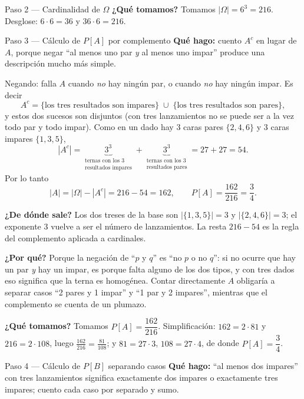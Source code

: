 \documentclass[11pt]{article}
\begin{document}
\begin{sol}
\begin{paso}{Paso 2 --- Cardinalidad de $\Omega$}
\textbf{¿Qu\'e tomamos?} Tomamos $|\Omega|=6^{3}=216$. Desglose: $6\cdot 6=36$ y $36\cdot 6=216$.
\end{paso}

\begin{paso}{Paso 3 --- C\'alculo de $P[A]$ por complemento}
\textbf{Qu\'e hago:} cuento $A^{c}$ en lugar de $A$, porque negar ``al menos uno par \emph{y} al menos uno impar'' produce una descripci\'on mucho m\'as simple.

Negando: falla $A$ cuando \emph{no} hay ning\'un par, o cuando \emph{no} hay ning\'un impar. Es decir
\[
A^{c}=\{\text{los tres resultados son impares}\}\;\cup\;\{\text{los tres resultados son pares}\},
\]
y estos dos sucesos son disjuntos (con tres lanzamientos no se puede ser a la vez todo par y todo impar). Como en un dado hay $3$ caras pares $\{2,4,6\}$ y $3$ caras impares $\{1,3,5\}$,
\[
|A^{c}|
=\underbrace{3^{3}}_{\substack{\text{ternas con los 3}\\ \text{resultados impares}}}
+\underbrace{3^{3}}_{\substack{\text{ternas con los 3}\\ \text{resultados pares}}}
=27+27=54 .
\]
Por lo tanto
\[
|A|=|\Omega|-|A^{c}|=216-54=162,
\qquad
P[A]=\frac{162}{216}=\frac{3}{4}.
\]

\textbf{¿De d\'onde sale?} Los dos treses de la base son $|\{1,3,5\}|=3$ y $|\{2,4,6\}|=3$; el exponente $3$ vuelve a ser el n\'umero de lanzamientos. La resta $216-54$ es la regla del complemento aplicada a cardinales.

\textbf{¿Por qu\'e?} Porque la negaci\'on de ``$p$ y $q$'' es ``no $p$ o no $q$'': si no ocurre que hay un par \emph{y} hay un impar, es porque falta alguno de los dos tipos, y con tres dados eso significa que la terna es homog\'enea. Contar directamente $A$ obligar\'ia a separar casos ``2 pares y 1 impar'' y ``1 par y 2 impares'', mientras que el complemento se cuenta de un plumazo.

\textbf{¿Qu\'e tomamos?} Tomamos $P[A]=\dfrac{162}{216}$. Simplificaci\'on: $162=2\cdot 81$ y $216=2\cdot 108$, luego $\frac{162}{216}=\frac{81}{108}$; y $81=27\cdot 3$, $108=27\cdot 4$, de donde $P[A]=\dfrac{3}{4}$.
\end{paso}

\begin{paso}{Paso 4 --- C\'alculo de $P[B]$ separando casos}
\textbf{Qu\'e hago:} ``al menos dos impares'' con tres lanzamientos significa exactamente dos impares o exactamente tres impares; cuento cada caso por separado y sumo.


\end{paso}
\end{sol}
\end{document}

